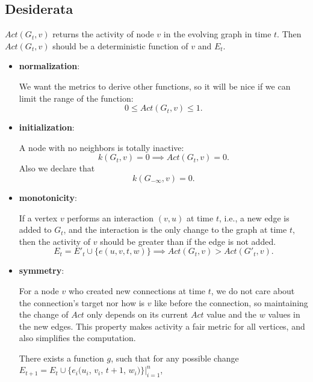 \documentclass[12pt,abstract=true]{scrartcl}
\numberwithin{equation}{section}
\theoremstyle{definition}   \newtheorem{definition}{Definition}[section]
\theoremstyle{plain}        \newtheorem{theorem}{Theorem}[section]
\theoremstyle{plain}        \newtheorem{observation}{Observation}[section]
\theoremstyle{plain}        \newtheorem{fact}{Fact}[section]
\theoremstyle{plain}        \newtheorem{claim}{Claim}[section]
\theoremstyle{plain}        \newtheorem{lemma}[theorem]{Lemma}
\theoremstyle{plain}        \newtheorem{corollary}[theorem]{Corollary}
\theoremstyle{remark}       \newtheorem{example}{Example}[section]
\theoremstyle{remark}       \newtheorem{remark}{Remark}[section]
\begin{document}
\subsection{Desiderata}
 $\mathit{Act}(G_t,v)$ returns the activity of node $v$ in the evolving graph in
time $t$. Then $\mathit{Act}(G_t,v)$ should be a deterministic function of $v$ and
$E_t$.
\begin{itemize}
\item \textbf{normalization}:

We want the metrics to derive other functions, so it will be nice if we can
limit the range of the function:
\begin{equation}
0\leq \mathit{Act}(G_t,v) \leq 1.
\end{equation}

\item \textbf{initialization}:

A node with no neighbors is totally inactive:
\begin{equation}
k(G_t,v)=0\implies \mathit{Act}(G_t,v)=0.
\end{equation}
Also we declare that
\begin{equation}
k(G_{-\infty},v)=0.
\end{equation}

\item \textbf{monotonicity}:

If a vertex $v$ performs an interaction $(v,u)$ at time $t$, i.e., a new edge
is added to $G_t$, and the interaction is the only change to the graph
at time $t$, then the activity of $v$ should be greater than if the edge is not
added.
\begin{equation}
E_t=E'_t\cup\{e(u,v,t,w)\}\implies \mathit{Act}(G_{t},v)>\mathit{Act}(G'_{t},v
).\label{eq-mono}
\end{equation}

\item \textbf{symmetry}:

For a node $v$ who created new connections at time $t$, we do not care about
the connection's target nor how is $v$ like before the connection, so
maintaining the change of $\mathit{Act}$ only depends on its current
$\mathit{Act}$ value and the $w$ values in the new edges. This property makes
activity a fair metric for all vertices, and also simplifies the computation.

There exists a function $g$, such that for any possible change
$E_{t+1}=E_t\cup\{e_i(u_i$, $v_i$, $t+1$, $w_i)\}|_{i=1}^n$,


\end{itemize}
\end{document}
